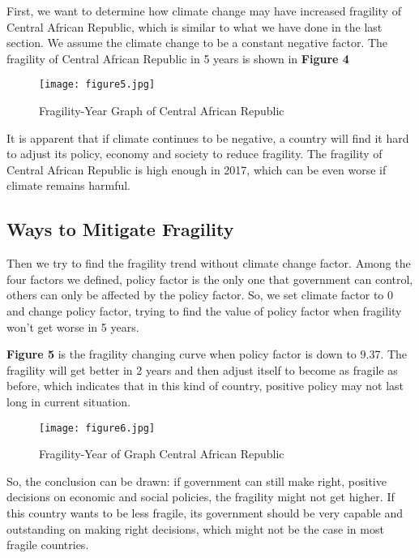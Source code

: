 \documentclass{mcmthesis}
\begin{document}
	First, we want to determine how climate change may have increased fragility of Central African Republic, which is similar to what we have done in the last section. We assume the climate change to be a constant negative factor. The fragility of Central African Republic in 5 years is shown in \textbf{Figure 4}
	
	\begin{figure}[h]
		\small
		\centering
		\texttt{[image: figure5.jpg]}
		\caption{Fragility-Year Graph of Central African Republic} \label{fig:Fragility-Year Central African Republic}
	\end{figure}
	
	It is apparent that if climate continues to be negative, a country will find it hard to adjust its policy, economy and society to reduce fragility. The fragility of Central African Republic is high enough in 2017, which can be even worse if climate remains harmful.


	\subsection{Ways to Mitigate Fragility}
	Then we try to find the fragility trend without climate change factor. Among the four factors we defined, policy factor is the only one that government can control, others can only be affected by the policy factor. So, we set climate factor to 0 and change policy factor, trying to find the value of policy factor when fragility won't get worse in 5 years.
	
	\textbf{Figure 5} is the fragility changing curve when policy factor is down to 9.37. The fragility will get better in 2 years and then adjust itself to become as fragile as before, which indicates that in this kind of country, positive policy may not last long in current situation.
	
	\begin{figure}[h]
		\small
		\centering
		\texttt{[image: figure6.jpg]}
		\caption{Fragility-Year of Graph Central African Republic} \label{fig:Fragility-Year Central African Republic}
	\end{figure}
	
	So, the conclusion can be drawn: if government can still make right, positive decisions on economic and social policies, the fragility might not get higher. If this country wants to be less fragile, its government should be very capable and outstanding on making right decisions, which might not be the case in most fragile countries.
\end{document}
